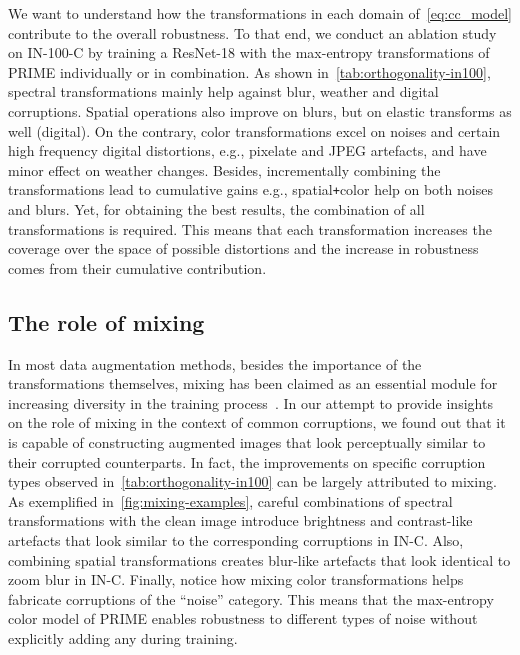 \documentclass[runningheads]{llncs}
\begin{document}
We want to understand how the transformations in each domain of~\cref{eq:cc_model} contribute to the overall robustness. To that end, we conduct an ablation study on IN-100-C by training a ResNet-18 with the max-entropy transformations of PRIME individually or in combination. As shown in~\cref{tab:orthogonality-in100}, spectral transformations mainly help against blur, weather and digital corruptions. Spatial operations also improve on blurs, but on elastic transforms as well (digital). On the contrary, color transformations excel on noises and certain high frequency digital distortions, e.g., pixelate and JPEG artefacts, and have minor effect on weather changes. Besides, incrementally combining the transformations lead to cumulative gains e.g., spatial\texttt{+}color help on both noises and blurs. Yet, for obtaining the best results, the combination of all transformations is required. This means that each transformation increases the coverage over the space of possible distortions and the increase in robustness comes from their cumulative contribution.

\subsection{The role of mixing}
\label{subsec:role_of_mixing}

In most data augmentation methods, besides the importance of the transformations themselves, mixing has been claimed as an essential module for increasing diversity in the training process~\cite{mixup2018,cutmix2019,augmix2020,augmax2021}. In our attempt to provide insights on the role of mixing in the context of common corruptions, we found out that it is capable of constructing augmented images that look perceptually similar to their corrupted counterparts. In fact, the improvements on specific corruption types observed in~\cref{tab:orthogonality-in100} can be largely attributed to mixing. As exemplified in~\cref{fig:mixing-examples}, careful combinations of spectral transformations with the clean image introduce brightness and contrast-like artefacts that look similar to the corresponding corruptions in IN-C. Also, combining spatial transformations creates blur-like artefacts that look identical to zoom blur in IN-C. Finally, notice how mixing color transformations helps fabricate corruptions of the ``noise'' category. This means that the max-entropy color model of PRIME enables robustness to different types of noise without explicitly adding any during training. 
\end{document}
